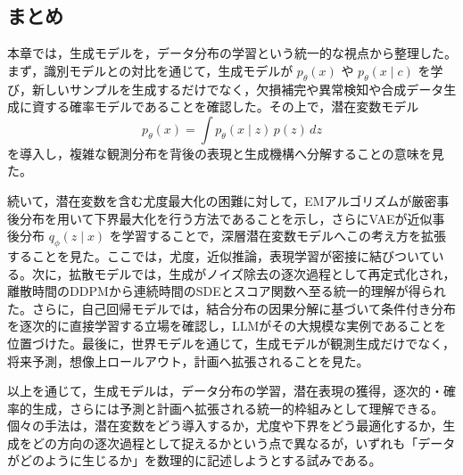 \subsection*{まとめ}

本章では，生成モデルを，データ分布の学習という統一的な視点から整理した。まず，識別モデルとの対比を通じて，生成モデルが \(p_{\theta}(x)\) や \(p_{\theta}(x \mid c)\) を学び，新しいサンプルを生成するだけでなく，欠損補完や異常検知や合成データ生成に資する確率モデルであることを確認した。その上で，潜在変数モデル
\begin{equation}
p_{\theta}(x)=\int p_{\theta}(x \mid z)\,p(z)\,dz
\end{equation}
を導入し，複雑な観測分布を背後の表現と生成機構へ分解することの意味を見た。

続いて，潜在変数を含む尤度最大化の困難に対して，EMアルゴリズムが厳密事後分布を用いて下界最大化を行う方法であることを示し，さらにVAEが近似事後分布 \(q_{\phi}(z \mid x)\) を学習することで，深層潜在変数モデルへこの考え方を拡張することを見た。ここでは，尤度，近似推論，表現学習が密接に結びついている。次に，拡散モデルでは，生成がノイズ除去の逐次過程として再定式化され，離散時間のDDPMから連続時間のSDEとスコア関数へ至る統一的理解が得られた。さらに，自己回帰モデルでは，結合分布の因果分解に基づいて条件付き分布を逐次的に直接学習する立場を確認し，LLMがその大規模な実例であることを位置づけた。最後に，世界モデルを通じて，生成モデルが観測生成だけでなく，将来予測，想像上ロールアウト，計画へ拡張されることを見た。

以上を通じて，生成モデルは，データ分布の学習，潜在表現の獲得，逐次的・確率的生成，さらには予測と計画へ拡張される統一的枠組みとして理解できる。個々の手法は，潜在変数をどう導入するか，尤度や下界をどう最適化するか，生成をどの方向の逐次過程として捉えるかという点で異なるが，いずれも「データがどのように生じるか」を数理的に記述しようとする試みである。
